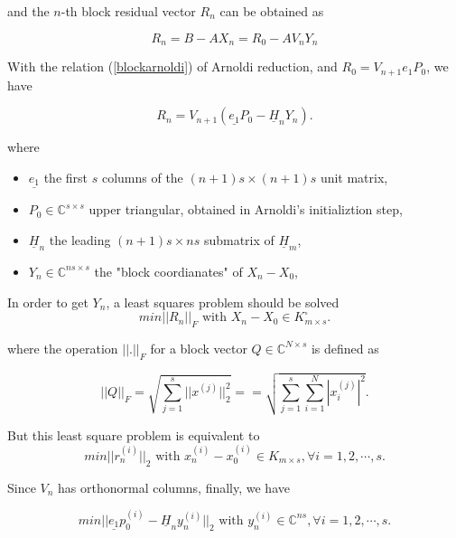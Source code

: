 and the $n$-th block residual vector $R_n$ can be obtained as 

\begin{equation}
	R_n= B-AX_n=R_0-AV_nY_n
\end{equation}

With the relation (\ref{blockarnoldi}) of Arnoldi reduction, and $R_0=V_{n+1}e_1P_0$, we have

\begin{equation}
	R_n=V_{n+1}(\underline{e_1}P_0-\underline{H}_nY_n).
\end{equation}

where
\begin{itemize}
	\item $\underline{e_1}$ the first $s$ columns of the $(n+1)s \times (n+1)s$ unit matrix,
	\item $P_0 \in \mathbb{C}^{s \times s}$ upper triangular, obtained in Arnoldi's initializtion step,
	\item $\underline{H}_n$ the leading $(n+1)s \times ns$ submatrix of $\underline{H}_m$,
	\item $Y_n \in \mathbb{C}^{ns \times s}$ the "block coordianates" of $X_n-X_0$,
\end{itemize}

In order to get $Y_n$, a least squares problem should be solved
\begin{equation}
\label{blockgmresls}
	\textit{min} ||R_n||_F \text{ with } X_n-X_0 \in K_{m\times s}^{\square}.
\end{equation}

where the operation $||.||_F$ for a block vector $Q \in \mathbb{C}^{N \times s}$ is defined as

\begin{equation}
	||Q||_F=\sqrt{\sum_{j=1}^{s}||x^{(j)}||_2^2}==\sqrt{\sum_{j=1}^{s}\sum_{i=1}^{N}|x_i^{(j)}|^2}.
\end{equation}

But this least square problem is equivalent to
\begin{equation}
	\textit{min} ||r_n^{(i)}||_2 \text{ with } x_n^{(i)}-x_0^{(i)} \in K_{m\times s}, \forall i=1,2,\cdots,s.
\end{equation}

Since $V_n$ has orthonormal columns, finally, we have

\begin{equation}
	\textit{min} ||\underline{e_1}p_0^{(i)}-\underline{H}_ny_n^{(i)}||_2 \text{ with } y_n^{(i)} \in \mathbb{C}^{ns}, \forall i=1,2,\cdots,s.
\end{equation}


